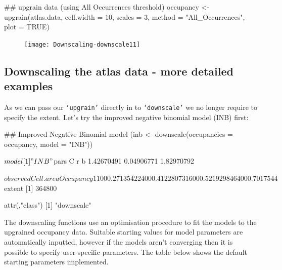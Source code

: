 \documentclass{article}[12pt, a4paper]
\begin{document}
\begin{Schunk}
\begin{Sinput}
## upgrain data (using All Occurrences threshold)
occupancy <- upgrain(atlas.data,
                     cell.width = 10,
                     scales = 3,
                     method = "All_Occurrences",
                     plot = TRUE)
\end{Sinput}
\end{Schunk}
\begin{figure}[!h]
\centering
\texttt{[image: Downscaling-downscale11]}
\end{figure}

\subsection{Downscaling the atlas data - more detailed examples}

As we can pass our \texttt{‘upgrain’} directly in to \texttt{‘downscale’} we no longer require to specify the extent. Let’s try the improved negative binomial model (INB) first:

\begin{Schunk}
\begin{Sinput}
## Improved Negative Binomial model
(inb <- downscale(occupancies = occupancy,
                  model = "INB"))
\end{Sinput}
\begin{Soutput}
$model
[1] "INB"

$pars
         C          r          b 
1.42670491 0.04906771 1.82970792 

$observed
  Cell.area Occupancy
1       100 0.2713542
2       400 0.4122807
3      1600 0.5219298
4      6400 0.7017544

$extent
[1] 364800

attr(,"class")
[1] "downscale"

\end{Soutput}
\end{Schunk}

The downscaling functions use an optimisation procedure to fit the models to the upgrained occupancy data. Suitable starting values for model parameters are automatically inputted, however if the models aren’t converging then it is possible to specify user-specific parameters. The table below shows the default starting parameters implemented.
\end{document}
